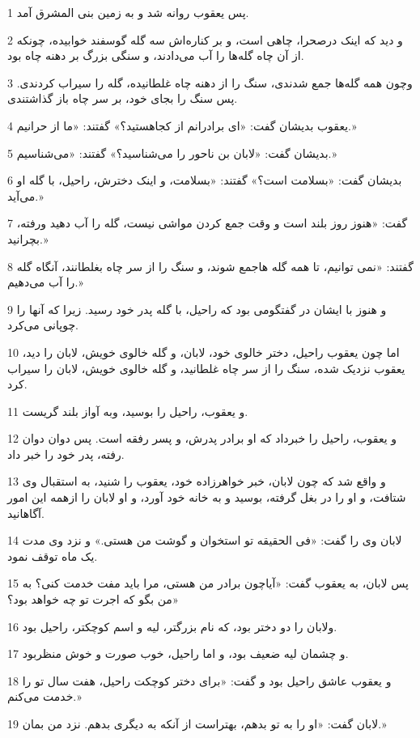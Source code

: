 \par 1 پس یعقوب روانه شد و به زمین بنی المشرق آمد.
\par 2 و دید که اینک درصحرا، چاهی است، و بر کناره‌اش سه گله گوسفند خوابیده، چونکه از آن چاه گله‌ها را آب می‌دادند، و سنگی بزرگ بر دهنه چاه بود.
\par 3 وچون همه گله‌ها جمع شدندی، سنگ را از دهنه چاه غلطانیده، گله را سیراب کردندی. پس سنگ را بجای خود، بر سر چاه باز گذاشتندی.
\par 4 یعقوب بدیشان گفت: «ای برادرانم از کجاهستید؟» گفتند: «ما از حرانیم.»
\par 5 بدیشان گفت: «لابان بن ناحور را می‌شناسید؟» گفتند: «می‌شناسیم.»
\par 6 بدیشان گفت: «بسلامت است؟» گفتند: «بسلامت، و اینک دخترش، راحیل، با گله او می‌آید.»
\par 7 گفت: «هنوز روز بلند است و وقت جمع کردن مواشی نیست، گله را آب دهید ورفته، بچرانید.»
\par 8 گفتند: «نمی توانیم، تا همه گله هاجمع شوند، و سنگ را از سر چاه بغلطانند، آنگاه گله را آب می‌دهیم.»
\par 9 و هنوز با ایشان در گفتگومی بود که راحیل، با گله پدر خود رسید. زیرا که آنها را چوپانی می‌کرد.
\par 10 اما چون یعقوب راحیل، دختر خالوی خود، لابان، و گله خالوی خویش، لابان را دید، یعقوب نزدیک شده، سنگ را از سر چاه غلطانید، و گله خالوی خویش، لابان را سیراب کرد.
\par 11 و یعقوب، راحیل را بوسید، وبه آواز بلند گریست.
\par 12 و یعقوب، راحیل را خبرداد که او برادر پدرش، و پسر رفقه است. پس دوان دوان رفته، پدر خود را خبر داد.
\par 13 و واقع شد که چون لابان، خبر خواهرزاده خود، یعقوب را شنید، به استقبال وی شتافت، و او را در بغل گرفته، بوسید و به خانه خود آورد، و او لابان را ازهمه این امور آگاهانید.
\par 14 لابان وی را گفت: «فی الحقیقه تو استخوان و گوشت من هستی.» و نزد وی مدت یک ماه توقف نمود.
\par 15 پس لابان، به یعقوب گفت: «آیاچون برادر من هستی، مرا باید مفت خدمت کنی؟ به من بگو که اجرت تو چه خواهد بود؟»
\par 16 ولابان را دو دختر بود، که نام بزرگتر، لیه و اسم کوچکتر، راحیل بود.
\par 17 و چشمان لیه ضعیف بود، و اما راحیل، خوب صورت و خوش منظربود.
\par 18 و یعقوب عاشق راحیل بود و گفت: «برای دختر کوچکت راحیل، هفت سال تو را خدمت می‌کنم.»
\par 19 لابان گفت: «او را به تو بدهم، بهتراست از آنکه به دیگری بدهم. نزد من بمان.»

